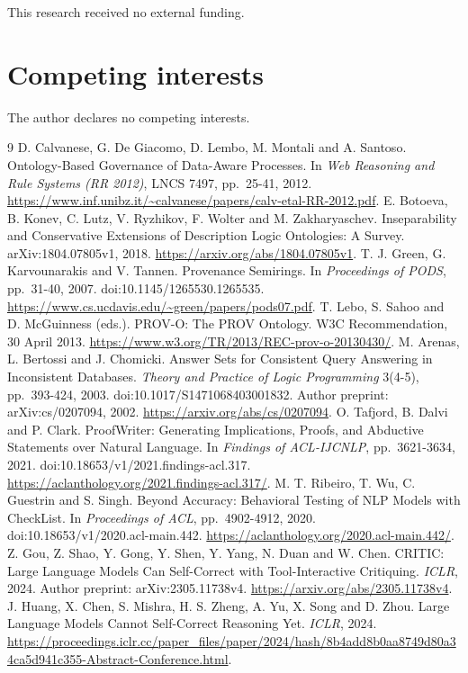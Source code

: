 \documentclass[a4paper,preprint,12pt,numbers,nopreprintline]{elsarticle}
\begin{document}
This research received no external funding.

\section*{Competing interests}\label{competing-interests}

The author declares no competing interests.

\begin{thebibliography}{9}
 D. Calvanese, G. De Giacomo, D. Lembo, M. Montali and A. Santoso. Ontology-Based Governance of Data-Aware Processes. In \emph{Web Reasoning and Rule Systems (RR 2012)}, LNCS 7497, pp.~25-41, 2012. \url{https://www.inf.unibz.it/~calvanese/papers/calv-etal-RR-2012.pdf}.
 E. Botoeva, B. Konev, C. Lutz, V. Ryzhikov, F. Wolter and M. Zakharyaschev. Inseparability and Conservative Extensions of Description Logic Ontologies: A Survey. arXiv:1804.07805v1, 2018. \url{https://arxiv.org/abs/1804.07805v1}.
 T. J. Green, G. Karvounarakis and V. Tannen. Provenance Semirings. In \emph{Proceedings of PODS}, pp.~31-40, 2007. doi:10.1145/1265530.1265535. \url{https://www.cs.ucdavis.edu/~green/papers/pods07.pdf}.
 T. Lebo, S. Sahoo and D. McGuinness (eds.). PROV-O: The PROV Ontology. W3C Recommendation, 30 April 2013. \url{https://www.w3.org/TR/2013/REC-prov-o-20130430/}.
 M. Arenas, L. Bertossi and J. Chomicki. Answer Sets for Consistent Query Answering in Inconsistent Databases. \emph{Theory and Practice of Logic Programming} 3(4-5), pp.~393-424, 2003. doi:10.1017/S1471068403001832. Author preprint: arXiv:cs/0207094, 2002. \url{https://arxiv.org/abs/cs/0207094}.
 O. Tafjord, B. Dalvi and P. Clark. ProofWriter: Generating Implications, Proofs, and Abductive Statements over Natural Language. In \emph{Findings of ACL-IJCNLP}, pp.~3621-3634, 2021. doi:10.18653/v1/2021.findings-acl.317. \url{https://aclanthology.org/2021.findings-acl.317/}.
 M. T. Ribeiro, T. Wu, C. Guestrin and S. Singh. Beyond Accuracy: Behavioral Testing of NLP Models with CheckList. In \emph{Proceedings of ACL}, pp.~4902-4912, 2020. doi:10.18653/v1/2020.acl-main.442. \url{https://aclanthology.org/2020.acl-main.442/}.
 Z. Gou, Z. Shao, Y. Gong, Y. Shen, Y. Yang, N. Duan and W. Chen. CRITIC: Large Language Models Can Self-Correct with Tool-Interactive Critiquing. \emph{ICLR}, 2024. Author preprint: arXiv:2305.11738v4. \url{https://arxiv.org/abs/2305.11738v4}.
 J. Huang, X. Chen, S. Mishra, H. S. Zheng, A. Yu, X. Song and D. Zhou. Large Language Models Cannot Self-Correct Reasoning Yet. \emph{ICLR}, 2024. \url{https://proceedings.iclr.cc/paper_files/paper/2024/hash/8b4add8b0aa8749d80a34ca5d941c355-Abstract-Conference.html}.
\end{thebibliography}
\end{document}

